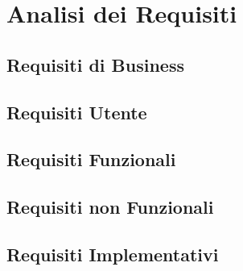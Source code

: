 \chapter{Analisi dei Requisiti}

\section{Requisiti di Business}
\section{Requisiti Utente}
\section{Requisiti Funzionali}
\section{Requisiti non Funzionali}
\section{Requisiti Implementativi}